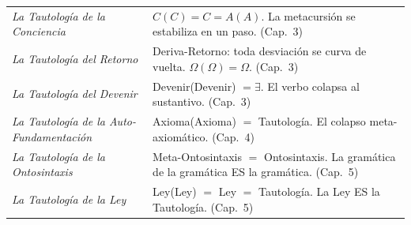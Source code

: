 \documentclass[10pt, openany, oneside]{book}
\begin{document}
{\begin{tabular}{@{} p{} @{\hspace{0.5em}} p{} @{}}
\textit{La Tautología de la Conciencia} & $C(C) = C = A(A)$. La metacursión se estabiliza en un paso. (Cap.\ 3) \\[0.3em]

\textit{La Tautología del Retorno} & Deriva-Retorno: toda desviación se curva de vuelta. $\Omega(\Omega) = \Omega$. (Cap.\ 3) \\[0.3em]

\textit{La Tautología del Devenir} & Devenir(Devenir) $= \exists$. El verbo colapsa al sustantivo. (Cap.\ 3) \\[0.3em]

\textit{La Tautología de la Auto-Fundamentación} & Axioma(Axioma) $=$ Tautología. El colapso meta-axiomático. (Cap.\ 4) \\[0.3em]

\textit{La Tautología de la Ontosintaxis} & Meta-Ontosintaxis $=$ Ontosintaxis. La gramática de la gramática ES la gramática. (Cap.\ 5) \\[0.3em]

\textit{La Tautología de la Ley} & Ley(Ley) $=$ Ley $=$ Tautología. La Ley ES la Tautología. (Cap.\ 5) \\[0.3em]

\end{tabular}
}
\end{document}

